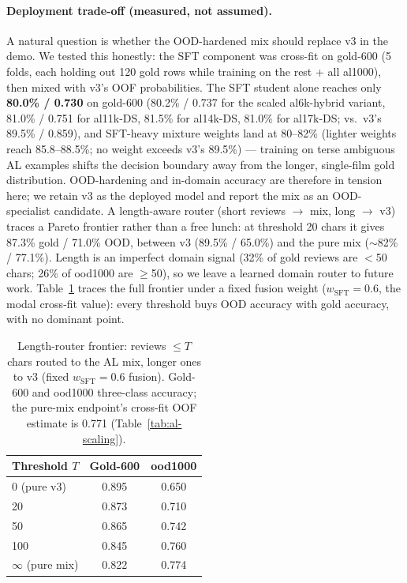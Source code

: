 \documentclass[11pt,a4paper]{article}
\begin{document}
\paragraph{Deployment trade-off (measured, not assumed).} A natural
question is whether the OOD-hardened mix should replace v3 in the
demo. We tested this honestly: the SFT component was cross-fit on
gold-600 (5 folds, each holding out 120 gold rows while training on
the rest + all al1000), then mixed with v3's OOF probabilities. The
SFT student alone reaches only \textbf{80.0\% / 0.730} on gold-600
(80.2\% / 0.737 for the scaled al6k-hybrid variant, 81.0\% / 0.751 for
al11k-DS, 81.5\% for al14k-DS, 81.0\% for al17k-DS; vs.\ v3's 89.5\% /
0.859), and SFT-heavy mixture weights land at
80--82\% (lighter weights reach 85.8--88.5\%; no weight exceeds v3's
89.5\%) --- training on terse ambiguous AL examples shifts the
decision boundary away from the longer, single-film gold
distribution. OOD-hardening and in-domain accuracy are therefore in
tension here; we retain v3 as the deployed model and report the mix as
an OOD-specialist candidate. A length-aware router (short reviews
$\to$ mix, long $\to$ v3) traces a Pareto frontier rather than a free
lunch: at threshold 20 chars it gives 87.3\% gold / 71.0\% OOD,
between v3 (89.5\% / 65.0\%) and the pure mix ($\sim$82\% / 77.1\%).
Length is an imperfect domain signal (32\% of gold reviews are $<$50
chars; 26\% of ood1000 are $\ge$50), so we leave a learned
 domain router to future work. Table~\ref{tab:router} traces the
full frontier under a fixed fusion weight ($w_{\mathrm{SFT}}{=}0.6$,
the modal cross-fit value): every threshold buys OOD accuracy with
gold accuracy, with no dominant point.

\begin{table}[H]
\centering\footnotesize
\caption{Length-router frontier: reviews $\le T$ chars routed to the
AL mix, longer ones to v3 (fixed $w_{\mathrm{SFT}}{=}0.6$ fusion).
Gold-600 and ood1000 three-class accuracy; the pure-mix endpoint's
cross-fit OOF estimate is 0.771 (Table~\ref{tab:al-scaling}).}
\label{tab:router}
\begin{tabular}{lcc}
\toprule
Threshold $T$ & Gold-600 & ood1000 \\
\midrule
0 (pure v3)      & 0.895 & 0.650 \\
20               & 0.873 & 0.710 \\
50               & 0.865 & 0.742 \\
100              & 0.845 & 0.760 \\
$\infty$ (pure mix) & 0.822 & 0.774 \\
\bottomrule
\end{tabular}
\end{table}
\end{document}
